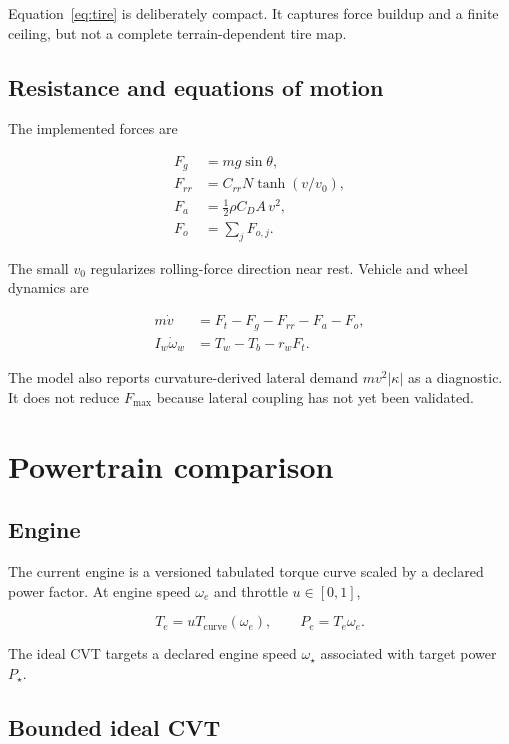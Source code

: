 \documentclass[11pt,oneside]{report}
\begin{document}
Equation~\eqref{eq:tire} is deliberately compact.  It captures force buildup and a
finite ceiling, but not a complete terrain-dependent tire map.

\section{Resistance and equations of motion}

The implemented forces are

\begin{align}
F_g &= mg\sin\theta,\\
F_{rr} &= C_{rr}N\tanh(v/v_0),\\
F_a &= \tfrac{1}{2}\rho C_DA\,v^2,\\
F_o &= \sum_j F_{o,j}.
\end{align}

The small $v_0$ regularizes rolling-force direction near rest.  Vehicle and wheel
dynamics are

\begin{align}
m\dot v &= F_t-F_g-F_{rr}-F_a-F_o,\label{eq:vehicle}\\
I_w\dot\omega_w &= T_w-T_b-r_wF_t.\label{eq:wheel}
\end{align}

The model also reports curvature-derived lateral demand $m v^2|\kappa|$ as a diagnostic.
It does not reduce $F_{\max}$ because lateral coupling has not yet been validated.

\chapter{Powertrain comparison}\label{ch:powertrain}

\section{Engine}

The current engine is a versioned tabulated torque curve scaled by a declared power
factor.  At engine speed $\omega_e$ and throttle $u\in[0,1]$,

\begin{equation}
T_e=uT_{\mathrm{curve}}(\omega_e),\qquad P_e=T_e\omega_e.
\end{equation}

The ideal CVT targets a declared engine speed $\omega_\star$ associated with target
power $P_\star$.

\section{Bounded ideal CVT}\label{sec:cvt}
\end{document}
